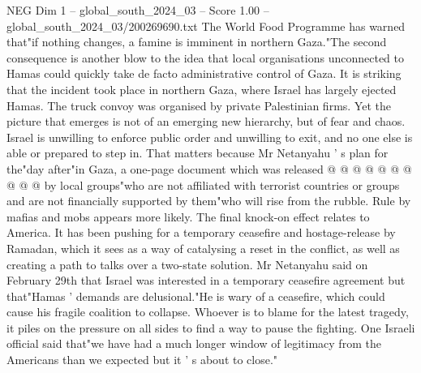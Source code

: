 \begin{textsample}{NEG Dim 1 – global\_south\_2024\_03 – Score 1.00 – global\_south\_2024\_03/200269690.txt}
The World Food Programme has warned that"if nothing changes, a famine is imminent in northern Gaza."The second consequence is another blow to the idea that local organisations unconnected to Hamas could quickly take de facto administrative control of Gaza.
It is striking that the incident took place in northern Gaza, where Israel has largely ejected Hamas.
The truck convoy was organised by private Palestinian firms.
Yet the picture that emerges is not of an emerging new hierarchy, but of fear and chaos.
Israel is unwilling to enforce public order and unwilling to exit, and no one else is able or prepared to step in.
That matters because Mr Netanyahu ' s plan for the"day after"in Gaza, a one-page document which was released @ @ @ @ @ @ @ @ @ @ by local groups"who are not affiliated with terrorist countries or groups and are not financially supported by them"who will rise from the rubble.
Rule by mafias and mobs appears more likely.
The final knock-on effect relates to America.
It has been pushing for a temporary ceasefire and hostage-release by Ramadan, which it sees as a way of catalysing a reset in the conflict, as well as creating a path to talks over a two-state solution.
Mr Netanyahu said on February 29th that Israel was interested in a temporary ceasefire agreement but that"Hamas ' demands are delusional."He is wary of a ceasefire, which could cause his fragile coalition to collapse.
Whoever is to blame for the latest tragedy, it piles on the pressure on all sides to find a way to pause the fighting.
One Israeli official said that"we have had a much longer window of legitimacy from the Americans than we expected but it ' s about to close."

\end{textsample}
